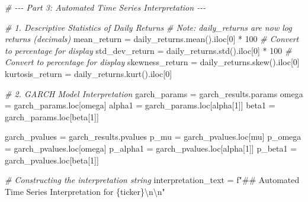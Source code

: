 \documentclass[
  11pt,
]{article}
\newenvironment{Shaded}{}{}
\newcommand{\CharTok}[1]{\textcolor[rgb]{0.25,0.44,0.63}{#1}}
\newcommand{\CommentTok}[1]{\textcolor[rgb]{0.38,0.63,0.69}{\textit{#1}}}
\newcommand{\DecValTok}[1]{\textcolor[rgb]{0.25,0.63,0.44}{#1}}
\newcommand{\NormalTok}[1]{#1}
\newcommand{\OperatorTok}[1]{\textcolor[rgb]{0.40,0.40,0.40}{#1}}
\newcommand{\SpecialCharTok}[1]{\textcolor[rgb]{0.25,0.44,0.63}{#1}}
\newcommand{\SpecialStringTok}[1]{\textcolor[rgb]{0.73,0.40,0.53}{#1}}
\newcommand{\StringTok}[1]{\textcolor[rgb]{0.25,0.44,0.63}{#1}}
\begin{document}
\begin{Shaded}
\begin{Highlighting}[]
\CommentTok{\# {-}{-}{-} Part 3: Automated Time Series Interpretation {-}{-}{-}}

\CommentTok{\# 1. Descriptive Statistics of Daily Returns}
\CommentTok{\# Note: daily\_returns are now log returns (decimals)}
\NormalTok{mean\_return }\OperatorTok{=}\NormalTok{ daily\_returns.mean().iloc[}\DecValTok{0}\NormalTok{] }\OperatorTok{*} \DecValTok{100} \CommentTok{\# Convert to percentage for display}
\NormalTok{std\_dev\_return }\OperatorTok{=}\NormalTok{ daily\_returns.std().iloc[}\DecValTok{0}\NormalTok{] }\OperatorTok{*} \DecValTok{100} \CommentTok{\# Convert to percentage for display}
\NormalTok{skewness\_return }\OperatorTok{=}\NormalTok{ daily\_returns.skew().iloc[}\DecValTok{0}\NormalTok{]}
\NormalTok{kurtosis\_return }\OperatorTok{=}\NormalTok{ daily\_returns.kurt().iloc[}\DecValTok{0}\NormalTok{]}

\CommentTok{\# 2. GARCH Model Interpretation}
\NormalTok{garch\_params }\OperatorTok{=}\NormalTok{ garch\_results.params}
\NormalTok{omega }\OperatorTok{=}\NormalTok{ garch\_params.loc[}\StringTok{\textquotesingle{}omega\textquotesingle{}}\NormalTok{]}
\NormalTok{alpha1 }\OperatorTok{=}\NormalTok{ garch\_params.loc[}\StringTok{\textquotesingle{}alpha[1]\textquotesingle{}}\NormalTok{]}
\NormalTok{beta1 }\OperatorTok{=}\NormalTok{ garch\_params.loc[}\StringTok{\textquotesingle{}beta[1]\textquotesingle{}}\NormalTok{]}

\NormalTok{garch\_pvalues }\OperatorTok{=}\NormalTok{ garch\_results.pvalues}
\NormalTok{p\_mu }\OperatorTok{=}\NormalTok{ garch\_pvalues.loc[}\StringTok{\textquotesingle{}mu\textquotesingle{}}\NormalTok{]}
\NormalTok{p\_omega }\OperatorTok{=}\NormalTok{ garch\_pvalues.loc[}\StringTok{\textquotesingle{}omega\textquotesingle{}}\NormalTok{]}
\NormalTok{p\_alpha1 }\OperatorTok{=}\NormalTok{ garch\_pvalues.loc[}\StringTok{\textquotesingle{}alpha[1]\textquotesingle{}}\NormalTok{]}
\NormalTok{p\_beta1 }\OperatorTok{=}\NormalTok{ garch\_pvalues.loc[}\StringTok{\textquotesingle{}beta[1]\textquotesingle{}}\NormalTok{]}

\CommentTok{\# Constructing the interpretation string}
\NormalTok{interpretation\_text }\OperatorTok{=} \SpecialStringTok{f"\#\# Automated Time Series Interpretation for }\SpecialCharTok{\{}\NormalTok{ticker}\SpecialCharTok{\}}\CharTok{\textbackslash{}n\textbackslash{}n}\SpecialStringTok{"}


\end{Highlighting}
\end{Shaded}
\end{document}
